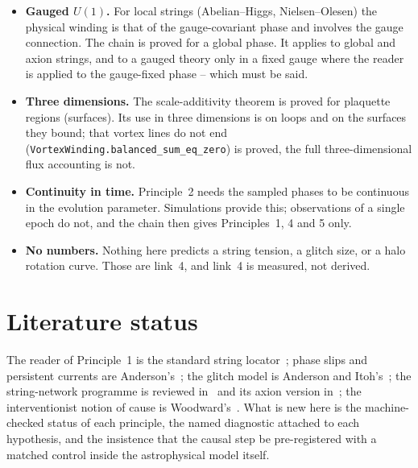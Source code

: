 \documentclass[11pt,a4paper]{article}
\newcommand{\lean}[1]{\texttt{\small #1}}
\begin{document}
\begin{failbox}
\begin{itemize}[leftmargin=*]
\item \textbf{Gauged $U(1)$.} For local strings (Abelian--Higgs, Nielsen--Olesen) the physical winding
  is that of the gauge-covariant phase and involves the gauge connection. The chain is proved for a
  global phase. It applies to global and axion strings, and to a gauged theory only in a fixed gauge
  where the reader is applied to the gauge-fixed phase -- which must be said.
\item \textbf{Three dimensions.} The scale-additivity theorem is proved for plaquette regions
  (surfaces). Its use in three dimensions is on loops and on the surfaces they bound; that vortex
  lines do not end (\lean{VortexWinding.balanced\_sum\_eq\_zero}) is proved, the full
  three-dimensional flux accounting is not.
\item \textbf{Continuity in time.} Principle~2 needs the sampled phases to be continuous in the
  evolution parameter. Simulations provide this; observations of a single epoch do not, and the
  chain then gives Principles~1, 4 and 5 only.
\item \textbf{No numbers.} Nothing here predicts a string tension, a glitch size, or a halo
  rotation curve. Those are link~4, and link~4 is measured, not derived.
\end{itemize}
\end{failbox}

\section{Literature status}
The reader of Principle~1 is the standard string locator~\cite{VachaspatiVilenkin1984}; phase slips
and persistent currents are Anderson's~\cite{Anderson1966}; the glitch model is Anderson and
Itoh's~\cite{AndersonItoh1975}; the string-network programme is
reviewed in~\cite{HindmarshKibble1995} and its axion version in~\cite{Gorghetto2018}; the
interventionist notion of cause is Woodward's~\cite{Woodward2003}. What is new here is the
machine-checked status of each principle, the named diagnostic attached to each hypothesis, and the
insistence that the causal step be pre-registered with a matched control inside the astrophysical
model itself.



\end{document}
